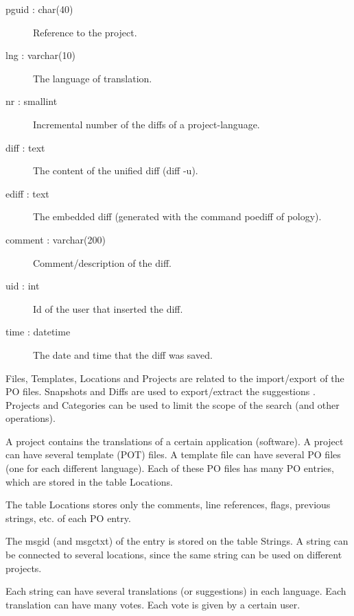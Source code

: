 \documentclass[11pt]{article}
\begin{document}
\begin{description}
\begin{description}
\item [pguid : char(40)] Reference to the project.
\item [lng : varchar(10)] The language of translation.
\item [nr : smallint] Incremental number of the diffs of a
                        project-language.
\item [diff : text] The content of the unified diff (diff -u).
\item [ediff : text] The embedded diff (generated with the command
                       poediff of pology).
\item [comment : varchar(200)] Comment/description of the diff.
\item [uid : int] Id of the user that inserted the diff.
\item [time : datetime] The date and time that the diff was saved.
\end{description}

\end{description}
   Files, Templates, Locations and Projects are related to the
   import/export of the PO files.  Snapshots and Diffs are used to
   export/extract the suggestions .  Projects and Categories can be
   used to limit the scope of the search (and other operations).

   A project contains the translations of a certain application
   (software).  A project can have several template (POT) files. A
   template file can have several PO files (one for each different
   language). Each of these PO files has many PO entries, which are
   stored in the table Locations.

   The table Locations stores only the comments, line references,
   flags, previous strings, etc. of each PO entry.

   The msgid (and msgctxt) of the entry is stored on the table
   Strings. A string can be connected to several locations, since the
   same string can be used on different projects.

   Each string can have several translations (or suggestions) in each
   language. Each translation can have many votes. Each vote is given
   by a certain user.
\end{document}
